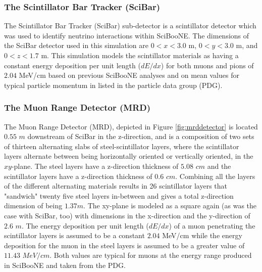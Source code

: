 \documentclass[11pt]{article}
\begin{document}
\subsubsection{The Scintillator Bar Tracker (SciBar)} \label{subsubsec:SciBar}
The Scintillator Bar Tracker (SciBar) sub-detector is a scintillator detector which was used to identify neutrino interactions within SciBooNE. The dimensions of the SciBar detector used in this simulation are $0 < x < 3.0$ m, $0 < y < 3.0$ m, and $0 < z < 1.7$ m. This simulation models the scintillator materials as having a constant energy deposition per unit length ($dE/dx$) for both muons and pions of $2.04$ MeV/cm based on previous SciBooNE analyses and on mean values for typical particle momentum in listed in the particle data group (PDG).

\subsubsection{The Muon Range Detector (MRD)}\label{subsubsec:MRD}
The Muon Range Detector (MRD), depicted in Figure \ref*{fig:mrddetector} is located $0.55$ $m$ downstream of SciBar in the z-direction, and is a composition of two sets of thirteen alternating slabs of steel-scintillator layers, where the scintillator layers alternate between being horizontally oriented or vertically oriented, in the $xy$-plane. The steel layers have a z-direction thickness of $5.08$ $cm$ and the scintillator layers have a z-direction thickness of $0.6$ $cm$. Combining all the layers of the different alternating materials results in 26 scintillator layers that "sandwich" twenty five steel layers in-between and gives a total z-direction dimension of being $1.37 m$. The xy-plane is modeled as a square again (as was the case with SciBar, too) with dimensions in the x-direction and the y-direction of $2.6$ $m$. The energy deposition per unit length ($dE/dx$) of a muon penetrating the scintillator layers is assumed to be a constant $2.04$ MeV/cm while the energy deposition for the muon in the steel layers is assumed to be a greater value of $11.43$ $MeV/cm$. Both values are typical for muons at the energy range produced in SciBooNE and taken from the PDG.
\end{document}
